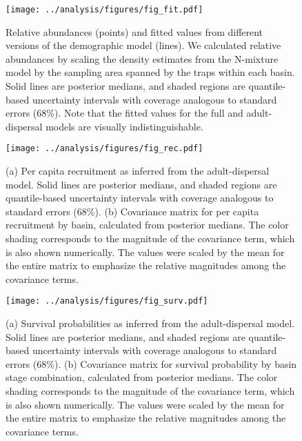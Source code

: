 \documentclass[11pt]{article}
\begin{document}
\clearpage
\begin{figure}
\centering
\texttt{[image: ../analysis/figures/fig\_fit.pdf]}
\caption{\label{fig:fit}
Relative abundances (points) and fitted values from different versions
of the demographic model (lines).
We calculated relative abundances by scaling the density estimates from the
N-mixture model by the sampling area spanned by the traps within each basin.
Solid lines are posterior medians,
and shaded regions are quantile-based uncertainty intervals
with coverage analogous to standard errors (68\%).
Note that the fitted values for the full and adult-dispersal models
are visually indistinguishable.
}
\end{figure}
\clearpage

\clearpage
\begin{figure}
\centering
\texttt{[image: ../analysis/figures/fig\_rec.pdf]}
\caption{\label{fig:rec}
(a) Per capita recruitment as inferred from the adult-dispersal model.
Solid lines are posterior medians,
and shaded regions are quantile-based uncertainty intervals
with coverage analogous to standard errors (68\%).
(b) Covariance matrix for per capita recruitment by basin,
calculated from posterior medians.
The color shading corresponds to the magnitude of the covariance term,
which is also shown numerically.
The values were scaled by the mean for the entire matrix to emphasize
the relative magnitudes among the covariance terms.
}
\end{figure}
\clearpage

\clearpage
\begin{figure}
\centering
\texttt{[image: ../analysis/figures/fig\_surv.pdf]}
\caption{\label{fig:surv}
(a) Survival probabilities as inferred from the adult-dispersal model.
Solid lines are posterior medians,
and shaded regions are quantile-based uncertainty intervals
with coverage analogous to standard errors (68\%).
(b) Covariance matrix for survival probability by basin \times stage combination,
calculated from posterior medians.
The color shading corresponds to the magnitude of the covariance term,
which is also shown numerically.
The values were scaled by the mean for the entire matrix to emphasize
the relative magnitudes among the covariance terms.
}
\end{figure}
\clearpage
\end{document}
